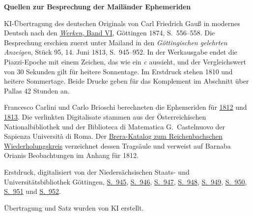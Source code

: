\clearpage\thispagestyle{empty}
\begin{center}\textbf{Quellen zur Besprechung der Mailänder Ephemeriden}\end{center}
\noindent KI-Übertragung des deutschen Originals von Carl Friedrich Gauß in modernes Deutsch nach den \href{https://gdz.sub.uni-goettingen.de/id/PPN236007467}{\emph{Werken}, Band VI}, Göttingen 1874, S.\ 556--558. Die Besprechung erschien zuerst unter Mailand in den \emph{Göttingischen gelehrten Anzeigen}, Stück 95, 14. Juni 1813, S.\ 945--952. In der Werkausgabe endet die Piazzi-Epoche mit einem Zeichen, das wie ein \emph{c} aussieht, und der Vergleichswert von 30 Sekunden gilt für heitere Sonnentage. Im Erstdruck stehen 1810 und heitere Sommertage. Beide Drucke geben für das Komplement im Abschnitt über Pallas 42 Stunden an.

\par\smallskip\noindent Francesco Carlini und Carlo Brioschi berechneten die Ephemeriden für \href{https://books.google.it/books?id=GDlZAAAAcAAJ}{1812} und \href{https://books.google.it/books?id=4HCOwKAJ28kC}{1813}. Die verlinkten Digitalisate stammen aus der Österreichischen Nationalbibliothek und der Biblioteca di Matematica G.~Castelnuovo der Sapienza Università di Roma. Der \href{https://www.beniculturali.inaf.it/opac/pst-iccd/circolo-moltiplicatore_13070}{Brera-Katalog zum Reichenbachschen Wiederholungskreis} verzeichnet dessen Tragsäule und verweist auf Barnaba Orianis Beobachtungen im Anhang für 1812.

\par\smallskip\noindent Erstdruck, digitalisiert von der Niedersächsischen Staats- und Universitätsbibliothek Göttingen, \href{https://images.p.sub.uni-goettingen.de/iiif/image/gdz:PPN319721507_1813:00000949/full/1650,/0/default.jpg}{S.\ 945}, \href{https://images.p.sub.uni-goettingen.de/iiif/image/gdz:PPN319721507_1813:00000950/full/1650,/0/default.jpg}{S.\ 946}, \href{https://images.p.sub.uni-goettingen.de/iiif/image/gdz:PPN319721507_1813:00000951/full/1650,/0/default.jpg}{S.\ 947}, \href{https://images.p.sub.uni-goettingen.de/iiif/image/gdz:PPN319721507_1813:00000952/full/1650,/0/default.jpg}{S.\ 948}, \href{https://images.p.sub.uni-goettingen.de/iiif/image/gdz:PPN319721507_1813:00000953/full/1650,/0/default.jpg}{S.\ 949}, \href{https://images.p.sub.uni-goettingen.de/iiif/image/gdz:PPN319721507_1813:00000954/full/1650,/0/default.jpg}{S.\ 950}, \href{https://images.p.sub.uni-goettingen.de/iiif/image/gdz:PPN319721507_1813:00000955/full/1650,/0/default.jpg}{S.\ 951} und \href{https://images.p.sub.uni-goettingen.de/iiif/image/gdz:PPN319721507_1813:00000956/full/1650,/0/default.jpg}{S.\ 952}.

\par\smallskip\noindent Übertragung und Satz wurden von KI erstellt.
\clearpage
